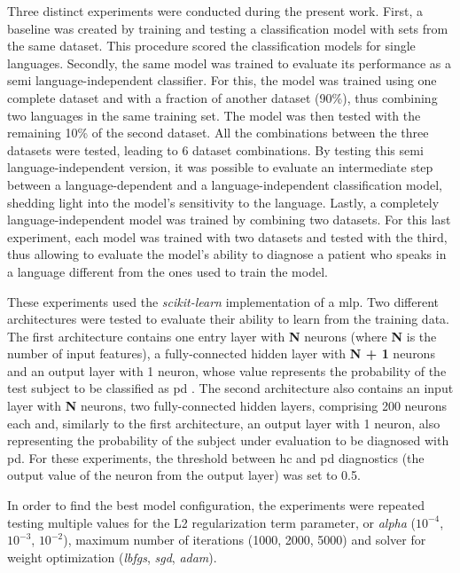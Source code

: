 Three distinct experiments were conducted during the present work. First, a baseline was created by training and testing a classification model with sets from the same dataset. This procedure scored the classification models for single languages. Secondly, the same model was trained to evaluate its performance as a semi language-independent classifier. For this, the model was trained using one complete dataset and with a fraction of another dataset (90\%), thus combining two languages in the same training set. The model was then tested with the remaining 10\% of the second dataset. All the combinations between the three datasets were tested, leading to 6 dataset combinations. By testing this semi language-independent version, it was possible to evaluate an intermediate step between a language-dependent and a language-independent classification model, shedding light into the model's sensitivity to the language. Lastly, a completely language-independent model was trained by combining two datasets. For this last experiment, each model was trained with two datasets and tested with the third, thus allowing to evaluate the model's ability to diagnose a patient who speaks in a language different from the ones used to train the model.

These experiments used the \textit{scikit-learn} implementation \cite{scikit-learn} of a \gls{mlp}. Two different architectures were tested to evaluate their ability to learn from the training data. The first architecture contains one entry layer with \textbf{N} neurons (where \textbf{N} is the number of input features), a fully-connected hidden layer with \textbf{N + 1} neurons and an output layer with 1 neuron, whose value represents the probability of the test subject to be classified as \gls{pd} \cite{alzheimer_2014_1}. The second architecture also contains an input layer with \textbf{N} neurons, two fully-connected hidden layers, comprising 200 neurons each and, similarly to the first architecture, an output layer with 1 neuron, also representing the probability of the subject under evaluation to be diagnosed with \gls{pd}. For these experiments, the threshold between \gls{hc} and \gls{pd} diagnostics (the output value of the neuron from the output layer) was set to 0.5.

In order to find the best model configuration, the experiments were repeated testing multiple values for the L2 regularization term parameter, or \textit{alpha} ($ 10^{-4} $, $ 10^{-3} $, $ 10 ^{-2} $), maximum number of iterations (1000, 2000, 5000) and solver for weight optimization (\textit{lbfgs}, \textit{sgd}, \textit{adam}). 

